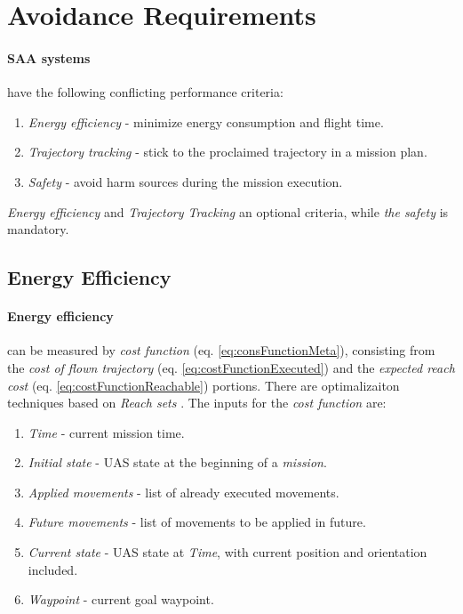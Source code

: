\section{Avoidance Requirements}\label{s:AvoidanceRequirements}

\paragraph{SAA systems} have the following conflicting performance criteria:
\begin{enumerate}
    \item \emph{Energy efficiency} - minimize energy consumption and flight time.
    \item \emph{Trajectory tracking} - stick to the proclaimed trajectory in a mission plan.
    \item \emph{Safety} - avoid harm sources during the mission execution.
\end{enumerate}

\begin{note}
    \emph{Energy efficiency} and \emph{Trajectory Tracking} an optional criteria, while \emph{the safety} is mandatory.
\end{note}

\subsection{Energy Efficiency}\label{s:EnergyEfficiency}
\paragraph{Energy efficiency} can be measured by \emph{cost function} (eq. \ref{eq:consFunctionMeta}), consisting from the \emph{cost of flown trajectory} (eq. \ref{eq:costFunctionExecuted}) and the \emph{expected reach cost} (eq. \ref{eq:costFunctionReachable}) portions. There are optimalizaiton techniques based on \emph{Reach sets} \cite{kurzhanski2001dynamic}. The inputs for the \emph{cost function} are:
\begin{enumerate}
    \item \emph{Time} - current mission time.
    \item \emph{Initial state} - UAS state at the beginning of a \emph{mission}.
    \item \emph{Applied movements} - list of already executed movements.
    \item  \emph{Future movements} - list of movements to be applied in future.
    \item \emph{Current state} - UAS state at \emph{Time}, with current position and orientation included.
    \item \emph{Waypoint} - current goal waypoint.
\end{enumerate}


